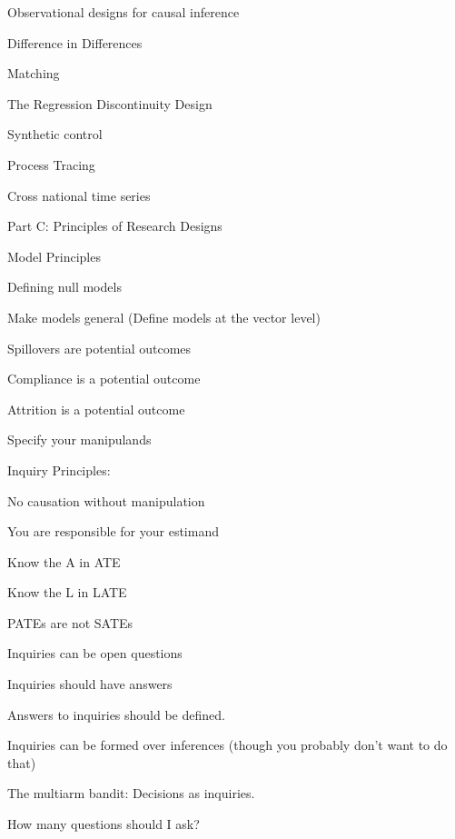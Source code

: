 \documentclass[11pt]{article}
\begin{document}
\begin{legal}
\begin{legal}
	\item Observational designs for causal inference
	
		\begin{legal}
		\item Difference in Differences
		\item 	Matching
		\item 	The Regression Discontinuity Design
		\item 	Synthetic control
		\item 	Process Tracing
		\item 	Cross national time series
		\end{legal}
	\end{legal}

\item Part C: Principles of Research Designs
	
	\begin{legal}
	\item Model Principles
	
		\begin{legal}
		\item 	Defining null models
		\item 	Make models general (Define models at the vector level)
		\item 	Spillovers are potential outcomes
		\item 	Compliance is a potential outcome
		\item 	Attrition is a potential outcome
		\item 	Specify your manipulands
		\end{legal}
		
	\item Inquiry Principles:
		
		\begin{legal}
					
		\item	No causation without manipulation
		\item	You are responsible for your estimand 
		\item	Know the A in ATE
		\item	Know the L in LATE 
		\item	PATEs are not SATEs
		\item	Inquiries can be open questions
		\item	Inquiries should have answers 
		\item	Answers to inquiries should be defined. 
		\item	Inquiries can be formed over inferences (though you probably don’t want to  do that)
		\item	The multiarm bandit: Decisions as inquiries. 
		\item	How many questions should I ask?
		\end{legal}
				

\end{legal}
\end{legal}
\end{document}

